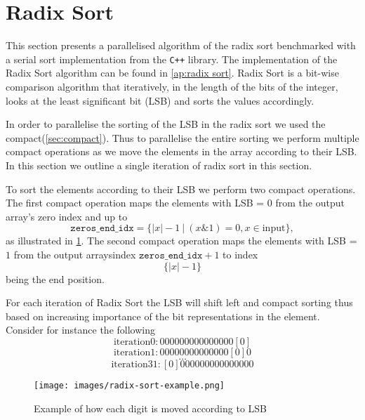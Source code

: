 \section{Radix Sort}
\label{sec:radix sort}

This section presents a parallelised algorithm of the radix sort benchmarked with a serial sort implementation from the \verb!C++! library.
The implementation of the Radix Sort algorithm can be found in \cref{ap:radix sort}.
Radix Sort is a bit-wise comparison algorithm that iteratively, in the length of the bits of the integer, looks at the least significant bit (LSB) and sorts the values accordingly.~\cite{udacity}

In order to parallelise the sorting of the LSB in the radix sort we used the compact(\cref{sec:compact}).  
Thus to parallelise the entire sorting we perform multiple compact operations as we move the elements in the array according to their LSB.
In this section we outline a single iteration of radix sort in this section.

To sort the elements according to their LSB we perform two compact operations.
The first compact operation maps the elements with LSB = 0 from the output array's zero index and up to 
\[\mathtt{zeros\_end\_idx} = \{|x|-1\ \bigg|\ (x\&1)=0, x \in \mathrm{input}\},\]
as illustrated in \cref{fig:radix sort example}.
The second compact operation maps the elements with LSB = $1$ from the output arraysindex $\mathtt{zeros\_end\_idx}+1$ to index \[\{|x|-1\}\] being the end position.  

For each iteration of Radix Sort the LSB will shift left and compact sorting thus based on increasing importance of the bit representations in the element.
Consider for instance the following
\[\mathrm{iteration 0:}0000 0000 0000 000[0]\]
\[\mathrm{iteration 1:}0000 0000 0000 00[0]0\]
\[ \ldots \]
\[\mathrm{iteration 31:}[0]000 0000 0000 0000\]

\begin{figure}[htb]
  \centering
  \texttt{[image: images/radix-sort-example.png]}
  \caption{Example of how each digit is moved according to LSB}
  \label{fig:radix sort example}
\end{figure}


